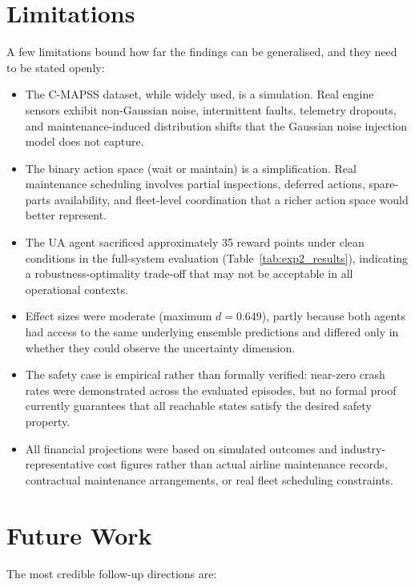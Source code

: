 \documentclass[12pt,a4paper]{report}
\begin{document}
\section{Limitations}

A few limitations bound how far the findings can be generalised, and they need to be stated openly:

\begin{itemize}
    \item The C-MAPSS dataset, while widely used, is a simulation. Real engine sensors exhibit non-Gaussian noise, intermittent faults, telemetry dropouts, and maintenance-induced distribution shifts that the Gaussian noise injection model does not capture.
    \item The binary action space (wait or maintain) is a simplification. Real maintenance scheduling involves partial inspections, deferred actions, spare-parts availability, and fleet-level coordination that a richer action space would better represent.
    \item The UA agent sacrificed approximately 35 reward points under clean conditions in the full-system evaluation (Table~\ref{tab:exp2_results}), indicating a robustness-optimality trade-off that may not be acceptable in all operational contexts.
    \item Effect sizes were moderate (maximum $d = 0.649$), partly because both agents had access to the same underlying ensemble predictions and differed only in whether they could observe the uncertainty dimension.
    \item The safety case is empirical rather than formally verified: near-zero crash rates were demonstrated across the evaluated episodes, but no formal proof currently guarantees that all reachable states satisfy the desired safety property.
    \item All financial projections were based on simulated outcomes and industry-representative cost figures rather than actual airline maintenance records, contractual maintenance arrangements, or real fleet scheduling constraints.
\end{itemize}

\section{Future Work}

The most credible follow-up directions are:
\end{document}
